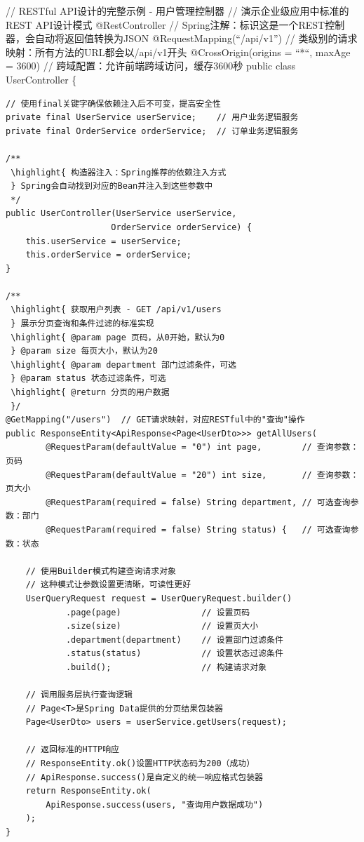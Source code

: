 // RESTful API设计的完整示例 - 用户管理控制器 // 演示企业级应用中标准的REST API设计模式 @RestController // Spring注解：标识这是一个REST控制器，会自动将返回值转换为JSON @RequestMapping(``/api/v1'') // 类级别的请求映射：所有方法的URL都会以/api/v1开头 @CrossOrigin(origins = ``*``, maxAge = 3600) // 跨域配置：允许前端跨域访问，缓存3600秒 public class UserController \{

\begin{verbatim}
// 使用final关键字确保依赖注入后不可变，提高安全性
private final UserService userService;    // 用户业务逻辑服务
private final OrderService orderService;  // 订单业务逻辑服务

/**
 \highlight{ 构造器注入：Spring推荐的依赖注入方式
 } Spring会自动找到对应的Bean并注入到这些参数中
 */
public UserController(UserService userService, 
                     OrderService orderService) {
    this.userService = userService;
    this.orderService = orderService;
}

/**
 \highlight{ 获取用户列表 - GET /api/v1/users
 } 展示分页查询和条件过滤的标准实现
 \highlight{ @param page 页码，从0开始，默认为0
 } @param size 每页大小，默认为20
 \highlight{ @param department 部门过滤条件，可选
 } @param status 状态过滤条件，可选
 \highlight{ @return 分页的用户数据
 }/
@GetMapping("/users")  // GET请求映射，对应RESTful中的"查询"操作
public ResponseEntity<ApiResponse<Page<UserDto>>> getAllUsers(
        @RequestParam(defaultValue = "0") int page,        // 查询参数：页码
        @RequestParam(defaultValue = "20") int size,       // 查询参数：页大小
        @RequestParam(required = false) String department, // 可选查询参数：部门
        @RequestParam(required = false) String status) {   // 可选查询参数：状态
    
    // 使用Builder模式构建查询请求对象
    // 这种模式让参数设置更清晰，可读性更好
    UserQueryRequest request = UserQueryRequest.builder()
            .page(page)                // 设置页码
            .size(size)                // 设置页大小
            .department(department)    // 设置部门过滤条件
            .status(status)            // 设置状态过滤条件
            .build();                  // 构建请求对象
            
    // 调用服务层执行查询逻辑
    // Page<T>是Spring Data提供的分页结果包装器
    Page<UserDto> users = userService.getUsers(request);
    
    // 返回标准的HTTP响应
    // ResponseEntity.ok()设置HTTP状态码为200（成功）
    // ApiResponse.success()是自定义的统一响应格式包装器
    return ResponseEntity.ok(
        ApiResponse.success(users, "查询用户数据成功")
    );
}


\end{verbatim}
